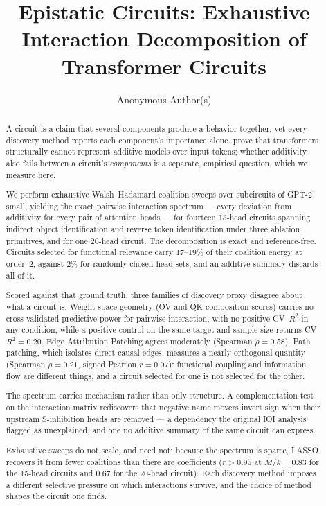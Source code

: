 \documentclass{article}
\title{Epistatic Circuits: Exhaustive Interaction Decomposition of Transformer Circuits}
\author{Anonymous Author(s)}
\begin{document}
\maketitle

\begin{abstract}
A circuit is a claim that several components produce a behavior together, yet every discovery
method reports each component's importance alone. \citet{leemann2024slalom} prove that
transformers structurally cannot represent additive models over input tokens; whether additivity
also fails between a circuit's \emph{components} is a separate, empirical question, which we measure here.

We perform exhaustive Walsh--Hadamard coalition sweeps over subcircuits of GPT-2 small, yielding the exact pairwise interaction spectrum --- every deviation from additivity for every pair of attention heads --- for fourteen 15-head circuits spanning indirect object
identification and reverse token identification under three ablation primitives, and for one
20-head circuit. The decomposition is exact and reference-free. Circuits selected for functional
relevance carry 17--19\% of their coalition energy at order~2, against 2\% for randomly chosen head sets, and an additive summary discards all of it.

Scored against that ground truth, three families of discovery proxy disagree about what a circuit
is. Weight-space geometry (OV and QK composition scores) carries no cross-validated predictive power for pairwise interaction, with no positive CV~$R^2$ in any condition, while a positive control on the same target and sample size returns CV~$R^2 = 0.20$. Edge Attribution
Patching agrees moderately (Spearman $\rho = 0.58$). Path patching, which isolates direct causal
edges, measures a nearly orthogonal quantity (Spearman $\rho = 0.21$, signed Pearson $r = 0.07$):
functional coupling and information flow are different things, and a circuit selected for one is
not selected for the other.

The spectrum carries mechanism rather than only structure. A complementation test on the
interaction matrix rediscovers that negative name movers invert sign when their upstream
S-inhibition heads are removed --- a dependency the original IOI analysis flagged as unexplained,
and one no additive summary of the same circuit can express.

Exhaustive sweeps do not scale, and need not: because the spectrum is sparse, LASSO recovers it
from fewer coalitions than there are coefficients ($r > 0.95$ at $M/k = 0.83$ for the 15-head
circuits and $0.67$ for the 20-head circuit). Each discovery method imposes a different selective
pressure on which interactions survive, and the choice of method shapes the circuit one finds.
\end{abstract}
\end{document}
